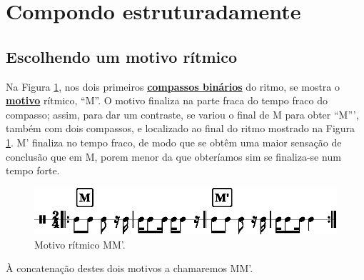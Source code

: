 
\section{Compondo estruturadamente}



\subsection{Escolhendo um motivo rítmico}
Na Figura \ref{fig:motivoritmico1}, 
nos  dois  primeiros \hyperref[subsec:compassobinario]{\textbf{compassos binários}} do ritmo,
 se mostra o  \hyperref[sec:Motivo]{\textbf{motivo}} rítmico, ``M''. 
O motivo finaliza na parte fraca do tempo fraco do compasso; assim,
para dar um contraste, se variou o final de M para obter ``M''', 
também com dois compassos, e localizado ao final do ritmo mostrado na Figura \ref{fig:motivoritmico1}. 
M' finaliza no tempo fraco, de modo que se obtêm uma maior sensação de conclusão que em M, 
porem menor da que obteríamos sim se finaliza-se num tempo forte.
\begin{figure}[H]
     \centering
     \includegraphics[width=\textwidth]{chapters/cap-musica-topicos/motivo-ritmico-1.eps}
     \caption{Motivo rítmico MM'.}
     \label{fig:motivoritmico1}
\end{figure}
À concatenação destes dois motivos a chamaremos MM'.


